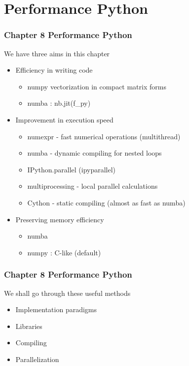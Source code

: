 \documentclass{beamer}
\begin{document}
\section{Performance Python} %
\begin{frame}
\frametitle{Chapter 8 Performance Python}
We have three aims in this chapter
\begin{itemize}
	\item Efficiency in writing code
	\begin{itemize}
		\item numpy vectorization in compact matrix forms
		\item numba : nb.jit(f\_py)
	\end{itemize}
	\item Improvement in execution speed
	\begin{itemize}
		\item numexpr - fast numerical operations (multithread)
		\item numba - dynamic compiling for nested loops
		\item IPython.parallel (ipyparallel)
		\item multiprocessing - local parallel calculations
		\item Cython - static compiling (almost as fast as numba)
	\end{itemize}
	\item Preserving memory efficiency
	\begin{itemize}
		\item numba
		\item numpy : C-like (default)
	\end{itemize}
\end{itemize}
\end{frame}

\begin{frame}
\frametitle{Chapter 8 Performance Python}
We shall go through these useful methods\\[4mm]
\begin{itemize}
	\item Implementation paradigms
	\item Libraries
	\item Compiling
	\item Parallelization
\end{itemize}
\end{frame}
\end{document}
